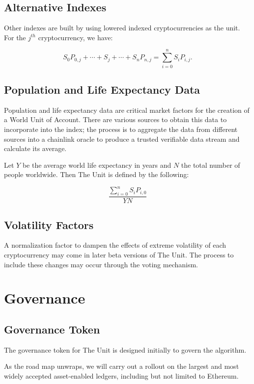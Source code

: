 \documentclass[12pt]{article}
\begin{document}
\subsection{Alternative Indexes}

Other indexes are built by using lowered indexed cryptocurrencies as the unit. For the $j^{th}$ cryptocurrency, we have:

$$
S_0P_{0,j}+\cdots+S_j+\cdots+S_nP_{n,j} = \sum_{i=0}^{n} S_iP_{i,j}.
$$


\subsection{Population and Life Expectancy Data}

Population and life expectancy data are critical market factors for the creation of a World Unit of Account. There are various sources to obtain this data to incorporate into the index; the process is to aggregate the data from different sources into a chainlink oracle to produce a trusted verifiable data stream and calculate its average. 


Let $Y$ be the average world life expectancy in years and $N$ the total number of people worldwide. Then The Unit is defined by the following:

$$
\frac{\displaystyle{\sum_{i=0}^{n} S_iP_{i,0}}}{Y N}
$$

\subsection{Volatility Factors}

A normalization factor to dampen the effects of extreme volatility of each cryptocurrency may come in later beta versions of The Unit. The process to include these changes may occur through the voting mechanism. 

\section{Governance}

\subsection{Governance Token}


The governance token for The Unit is designed initially to govern the algorithm. 

As the road map unwraps, we will carry out a rollout on the largest and most widely accepted asset-enabled ledgers, including but not limited to Ethereum.
\end{document}

